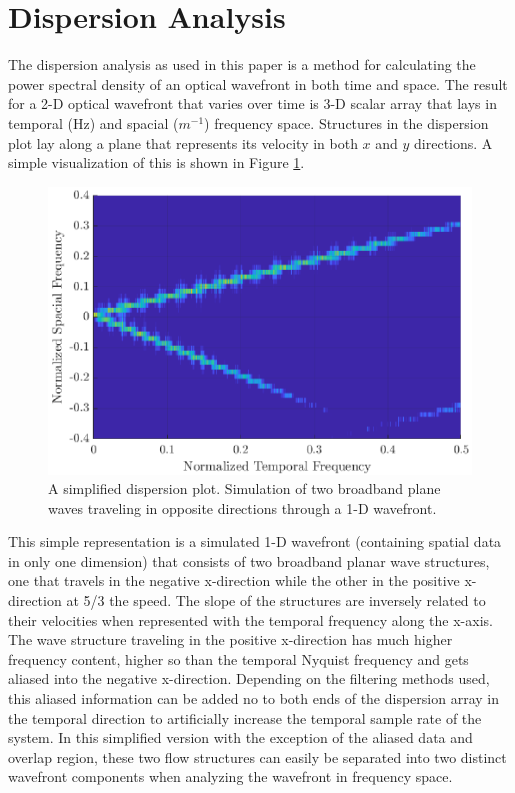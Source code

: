 \section{Dispersion Analysis}
The dispersion analysis as used in this paper is a method for calculating the power spectral density of an optical wavefront in both time and space.
The result for a 2-D optical wavefront that varies over time is 3-D scalar array that lays in temporal (Hz) and spacial ($m^{-1}$) frequency space.
Structures in the dispersion plot lay along a plane that represents its velocity in both $x$ and $y$ directions.
A simple visualization of this is shown in Figure \ref{fig:04_simple_dispersion}.
\begin{figure}
  \centering
  \includegraphics{../matlab/04_basic_filtering/simple_dispersion.eps}
  \caption{A simplified dispersion plot.  Simulation of two broadband plane waves traveling in opposite directions through a 1-D wavefront.}
  \label{fig:04_simple_dispersion}
\end{figure}
This simple representation is a simulated 1-D wavefront (containing spatial data in only one dimension) that consists of two broadband planar wave structures, one that travels in the negative x-direction while the other in the positive x-direction at 5/3 the speed.
The slope of the structures are inversely related to their velocities when represented with the temporal frequency along the x-axis.
The wave structure traveling in the positive x-direction has much higher frequency content, higher so than the temporal Nyquist frequency and gets aliased into the negative x-direction.
Depending on the filtering methods used, this aliased information can be added no to both ends of the dispersion array in the temporal direction to artificially increase the temporal sample rate of the system.
In this simplified version with the exception of the aliased data and overlap region, these two flow structures can easily be separated into two distinct wavefront components when analyzing the wavefront in frequency space.

